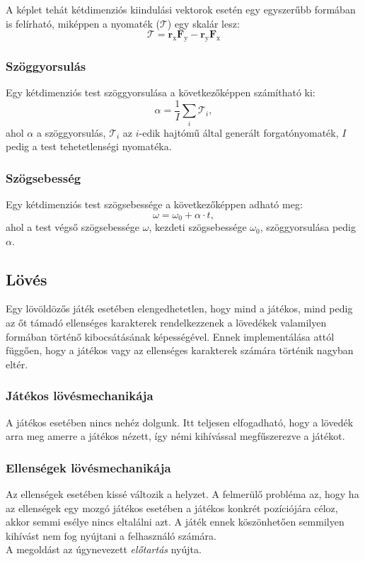 \documentclass[12pt]{report}
\begin{document}
A képlet tehát kétdimenziós kiindulási vektorok esetén egy egyszerűbb formában is felírható, miképpen a nyomaték ($\mathcal{T}$) egy skalár lesz:
\[
    \mathcal{T} = \mathbf{r}_{\text{x}} \mathbf{F}_{\text{y}} - \mathbf{r}_{\text{y}} \mathbf{F}_{\text{x}}
\]

\subsubsection{Szöggyorsulás}

Egy kétdimenziós test szöggyorsulása a következőképpen számítható ki:
\[
    \alpha = \frac{1}{I} \sum_{i} \mathcal{T}_i,
\]
ahol $\alpha$ a szöggyorsulás, $\mathcal{T}_i$ az $i$-edik hajtómű által generált forgatónyomaték, $I$ pedig a test tehetetlenségi nyomatéka.

\subsubsection{Szögsebesség}

Egy kétdimenziós test szögsebessége a következőképpen adható meg:
\[
    \omega = \omega_0 + \alpha \cdot t,
\]
ahol a test végső szögsebessége $\omega$, kezdeti szögsebessége $\omega_0$, szöggyorsulása pedig $\alpha$.

\subsection{Lövés}
Egy lövöldözős játék esetében elengedhetetlen, hogy mind a játékos, mind pedig az őt támadó ellenséges karakterek rendelkezzenek a lövedékek valamilyen formában történő kibocsátásának képességével. Ennek implementálása attól függően, hogy a játékos vagy az ellenséges karakterek számára történik nagyban eltér.

\subsubsection{Játékos lövésmechanikája}
A játékos esetében nincs nehéz dolgunk. Itt teljesen elfogadható, hogy a lövedék arra meg amerre a játékos nézett, így némi kihívással megfűszerezve a játékot.

\subsubsection{Ellenségek lövésmechanikája}
Az ellenségek esetében kissé változik a helyzet. A felmerülő probléma az, hogy ha az ellenségek egy mozgó játékos esetében a játékos konkrét pozíciójára céloz, akkor semmi esélye nincs eltalálni azt. A játék ennek köszönhetően semmilyen kihívást nem fog nyújtani a felhasználó számára.\\
A megoldást az úgynevezett \textit{előtartás} nyújta.
\end{document}

